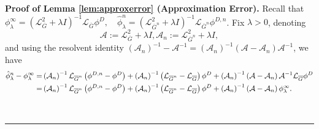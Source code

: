 \documentclass[12pt]{article}
\def\Gbar{ {\overline{G}} }
\newenvironment{proof}[1][Proof]{\noindent\textbf{#1.} }{\ \rule{0.5em}{0.5em}}
\numberwithin{equation}{section}
\numberwithin{theorem}{section}
\begin{document}
\begin{proof}[Proof of Lemma \ref{lem:approxerror} (Approximation Error)]
Recall that 
 $ {\phi}_\lambda^{\infty}=\left(\mathcal{L}_{\Gbar}^2+\lambda I\right)^{-1} \mathcal{L}_{\Gbar} \phi^D, \quad \hat{\phi}_\lambda^n=\left(\mathcal{L}_{\Gbar^n}^2+\lambda I\right)^{-1} \mathcal{L}_{\Gbar^n} \phi^{D,n} $.  
 Fix $\lambda>0$, denoting 
$$
\mathcal{A}:=\mathcal{L}_{\Gbar}^2+\lambda I, \mathcal{A}_n:=\mathcal{L}_{\Gbar^n}^2+\lambda I, 
$$ 
and using the resolvent identity $\left(\mathcal{A}_n\right)^{-1}- \mathcal{A}^{-1} = \left(\mathcal{A}_n\right)^{-1}\left(\mathcal{A}-\mathcal{A}_n\right) \mathcal{A}^{-1}$, we have 
\begin{align}
\hat{\phi}_\lambda^n-{\phi}_\lambda^{\infty}  
 =& \left(\mathcal{A}_n\right)^{-1} \mathcal{L}_{\Gbar^n}\left(\phi^{D,n}- \phi^D\right)+\left(\mathcal{A}_n\right)^{-1}\left(\mathcal{L}_{\Gbar^n}-\mathcal{L}_{\Gbar}\right) \phi^D+\left(\mathcal{A}_n\right)^{-1}\left(\mathcal{A}-\mathcal{A}_n\right) \mathcal{A}^{-1} \mathcal{L}_{\Gbar} \phi^D \notag  \\
=&\left(\mathcal{A}_n\right)^{-1} \mathcal{L}_{\Gbar^n}\left(\phi^{D,n}- \phi^D\right)+\left(\mathcal{A}_n\right)^{-1}\left(\mathcal{L}_{\Gbar^n}-\mathcal{L}_{\Gbar}\right) \phi^D+\left(\mathcal{A}_n\right)^{-1}\left(\mathcal{A}-\mathcal{A}_n\right){\phi}_\lambda^{\infty}. \label{eq:decompapproxerror}
\end{align}



\end{proof}
\end{document}
